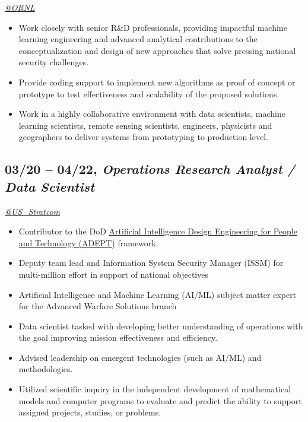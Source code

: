 \documentclass[10pt]{article}
\def\tightlist{}
\begin{document}
\emph{\href{https://twitter.com/ORNL}{@ORNL}}

\begin{itemize}
\tightlist
\item
  Work closely with senior R\&D professionals, providing impactful
  machine learning engineering and advanced analytical contributions to
  the conceptualization and design of new approaches that solve pressing
  national security challenges.
\item
  Provide coding support to implement new algorithms as proof of concept
  or prototype to test effectiveness and scalability of the proposed
  solutions.
\item
  Work in a highly collaborative environment with data scientists,
  machine learning scientists, remote sensing scientists, engineers,
  physicists and geographers to deliver systems from prototyping to
  production level.
\end{itemize}

\subsection{\texorpdfstring{03/20 -- 04/22, \textbf{\emph{Operations
Research Analyst / Data
Scientist}}}{03/20 -- 04/22, Operations Research Analyst / Data Scientist}}\label{operations-research-analyst-data-scientist}

\emph{\href{https://twitter.com/US_Stratcom}{@US\_Stratcom}}

\begin{itemize}
\tightlist
\item
  Contributor to the DoD
  \href{https://community.apan.org/wg/adept-framework/}{Artificial
  Intelligence Design Engineering for People and Technology (ADEPT)}
  framework.
\item
  Deputy team lead and Information System Security Manager (ISSM) for
  multi-million effort in support of national objectives
\item
  Artificial Intelligence and Machine Learning (AI/ML) subject matter
  expert for the Advanced Warfare Solutions branch
\item
  Data scientist tasked with developing better understanding of
  operations with the goal improving mission effectiveness and
  efficiency.
\item
  Advised leadership on emergent technologies (such as AI/ML) and
  methodologies.
\item
  Utilized scientific inquiry in the independent development of
  mathematical models and computer programs to evaluate and predict the
  ability to support assigned projects, studies, or problems.
\end{itemize}
\end{document}

